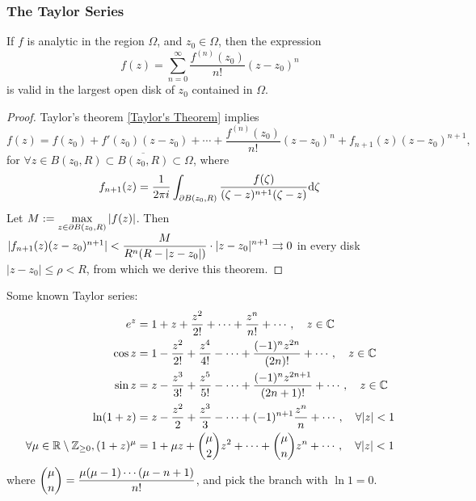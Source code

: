 \subsubsection{The Taylor Series}
\begin{theorem}\label{thm:5.1.2:Theorem of Taylor Series}
    If  $ f  $ is analytic in the region  $ \Omega  $, and  $ z_0\in \Omega  $, then the expression 
    \begin{equation}
        f(z)=\sum_{n=0}^\infty \frac{f^{(n)}(z_0)}{n!}(z-z_0)^n
    \end{equation}
    is valid in the largest open disk of  $ z_0 $ contained in   $ \Omega  $.
\end{theorem}
\begin{proof}
    Taylor's theorem \ref{Taylor's Theorem} implies 
    \begin{equation}
        f(z)=f(z_0)+f'(z_0)(z-z_0)+\cdots+\frac{f^{(n)}(z_0)}{n!}(z-z_0)^n+f_{n+1}(z)(z-z_0)^{n+1},\,
    \end{equation}
    for  $ \forall z\in B(z_0,R)\subset \overline{B(z_0,R)}\subset \Omega $, where  
    \begin{equation}
        f_{n+1}(z)=\displaystyle\frac{1}{2\pi i}\int_{\partial B(z_0,R)}\frac{f(\zeta)}{(\zeta-z)^{n+1}(\zeta-z)}\mathrm{d}\zeta 
    \end{equation}
    Let  $ M:=\displaystyle\max_{z\in\partial B(z_0,R)}|f(z)| $. Then  $ |f_{n+1}(z)(z-z_0)^{n+1}|<\displaystyle\frac{M}{R^n(R-|z-z_0|)}\cdot |z-z_0|^{n+1}\rightrightarrows 0$ in every disk  $ |z-z_0| \leq \rho<R $, from which we derive this theorem.
\end{proof}


Some known Taylor series:
\begin{equation}
    \begin{aligned}\label{eq:5.1.2Taylor Series of some functions}
        e^z&=1+z+\frac{z^2}{2!}+\cdots+\frac{z^n}{n!}+\cdots,\quad z\in \mathbb C\\
        \cos z&=1-\frac{z^2}{2!}+\frac{z^4}{4!}-\cdots+\frac{(-1)^n z^{2n}}{(2n)!}+\cdots,\quad z\in \mathbb C\\
        \sin z &= z-\frac{z^3}{3!}+\frac{z^5}{5!}-\cdots+\frac{(-1)^n z^{2n+1}}{(2n+1)!}+\cdots,\quad z\in \mathbb C\\
        \ln  (1+z)&=z-\frac{z^2}{2}+\frac{z^3}{3}-\cdots+(-1)^{n+1}\frac{z^n}{n}+\cdots,\quad \forall |z|<1\\
        \forall \mu\in \mathbb R\setminus\mathbb Z_{\geq 0},(1+z)^{\mu}&=1+\mu z+\binom{\mu}{2}z^2+\cdots+\binom{\mu }{n}z^n+\cdots,\quad \forall |z|<1
    \end{aligned}
\end{equation}
where  $ \displaystyle\binom{\mu }{n}=\frac{\mu (\mu -1)\cdots(\mu -n+1)}{n!} $, and pick the branch with  $ \ln 1=0 $.

